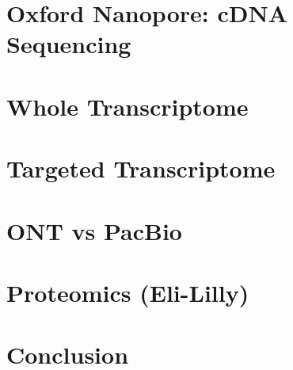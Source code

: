 \documentclass[a4paper,12pt,oneside]{report}
\begin{document}
\chapter{Oxford Nanopore: cDNA Sequencing}
%
%

\chapter{Whole Transcriptome}


\chapter{Targeted Transcriptome}
%
%

\chapter{ONT vs PacBio}


\chapter{Proteomics (Eli-Lilly)}

\chapter{Conclusion}
%


\end{document}
